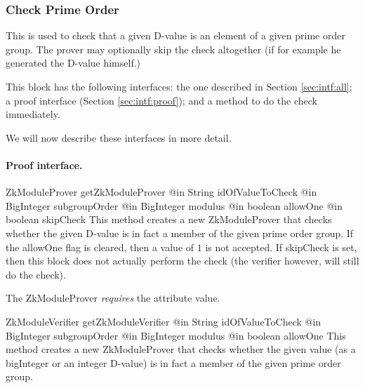     \subsubsection{Check Prime Order}

    This is used to check that a given D-value is
    an element of a given prime order group.
    The prover may optionally skip the check altogether (if for example he generated
    the D-value himself.)

    This block has the following interfaces:
    the one described in Section \ref{sec:intf:all};
    a proof interface (Section \ref{sec:intf:proof});
    and a method to do the check immediately.

      We will now describe these interfaces in more detail.

    \paragraph{Proof interface.}
      \begin{method}
      {ZkModuleProver}
      {getZkModuleProver}
      {
        {@in String idOfValueToCheck}
        {@in BigInteger subgroupOrder}
        {@in BigInteger modulus}
        {@in boolean allowOne}
        {@in boolean skipCheck}
      }
      This method creates a new ZkModuleProver that checks whether the given D-value is in fact a member of
      the given prime order group.
      If the allowOne flag is cleared, then a value of $1$ is not accepted.
      If skipCheck is set, then this block does not actually perform the check
      (the verifier however, will still do the check).

      The ZkModuleProver \emph{requires} the attribute value.

      \end{method}
      \begin{method}
      {ZkModuleVerifier}
      {getZkModuleVerifier}
      {
        {@in String idOfValueToCheck}
        {@in BigInteger subgroupOrder}
        {@in BigInteger modulus}
        {@in boolean allowOne}
      }
      This method creates a new ZkModuleProver that checks whether the given
      value (as a bigInteger or an integer D-value) is in fact a member of
      the given prime order group.
      \end{method}
